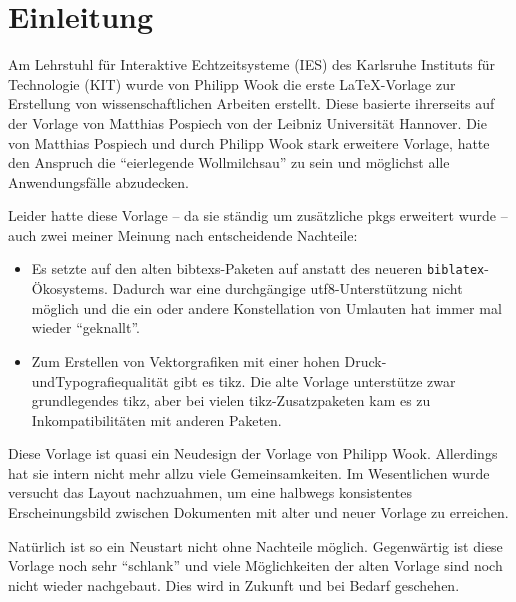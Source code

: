 \chapter{Einleitung}

Am Lehrstuhl für Interaktive Echtzeitsysteme (IES) des Karlsruhe Instituts für
Technologie (KIT) wurde von Philipp Wook die erste LaTeX-Vorlage zur Erstellung
von wissenschaftlichen Arbeiten erstellt. Diese basierte ihrerseits auf der
Vorlage von Matthias Pospiech von der Leibniz Universität Hannover. Die von
Matthias Pospiech und durch Philipp Wook stark erweitere Vorlage, hatte den
Anspruch die \enquote{eierlegende Wollmilchsau} zu sein und möglichst alle
Anwendungsfälle abzudecken.

Leider hatte diese Vorlage -- da sie ständig um zusätzliche \glspl{pkg} erweitert
wurde -- auch zwei meiner Meinung nach entscheidende Nachteile:
\begin{itemize}
  \item Es setzte auf den alten \glspl{bibtex}-Paketen auf anstatt des neueren
	  \texttt{biblatex}-Ökosystems. Dadurch war eine durchgängige
		\gls{utf8}-Unterstützung nicht möglich und die ein oder andere Konstellation
		von Umlauten hat immer mal wieder \enquote{geknallt}.
		
  \item Zum Erstellen von Vektorgrafiken mit einer hohen
	Druck- undTypografiequalität gibt es \gls{tikz}. Die alte Vorlage unterstütze
	zwar 	grundlegendes \gls{tikz}, aber bei vielen \gls{tikz}-Zusatzpaketen kam
	es zu 	Inkompatibilitäten mit anderen Paketen.
\end{itemize}

Diese Vorlage ist quasi ein Neudesign der Vorlage von Philipp Wook. Allerdings
hat sie intern nicht mehr allzu viele Gemeinsamkeiten. Im Wesentlichen wurde
versucht das Layout nachzuahmen, um eine halbwegs konsistentes Erscheinungsbild
zwischen Dokumenten mit alter und neuer Vorlage zu erreichen.

Natürlich ist so ein Neustart nicht ohne Nachteile möglich. Gegenwärtig ist
diese Vorlage noch sehr \enquote{schlank} und viele Möglichkeiten der alten
Vorlage sind noch nicht wieder nachgebaut. Dies wird in Zukunft und bei Bedarf
geschehen.

